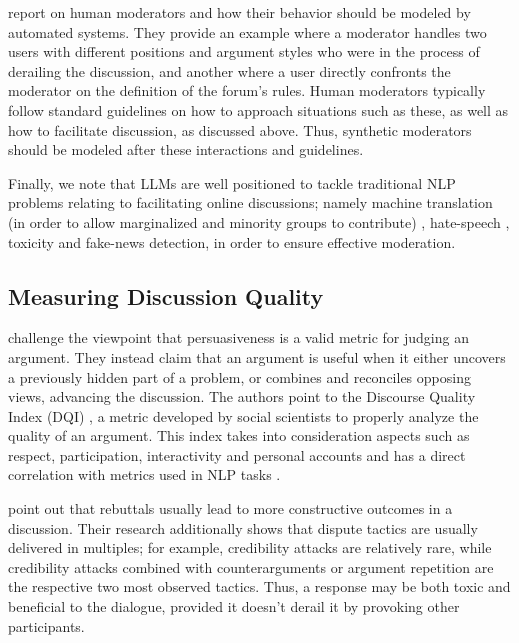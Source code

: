 \citet{vecchi-2021-towards} report on human moderators and how their behavior should be modeled by automated systems. They provide an example where a moderator handles two users with different positions and argument styles who were in the process of derailing the discussion, and another where a user directly confronts the moderator on the definition of the forum's rules. Human moderators typically follow standard guidelines on how to approach situations such as these, as well as how to facilitate discussion, as discussed above. Thus, synthetic moderators should be modeled after these interactions and guidelines.

Finally, we note that LLMs are well positioned to tackle traditional \ac{NLP} problems relating to facilitating online discussions; namely machine translation (in order to allow marginalized and minority groups to contribute) \cite{Tsai2024Generative}, hate-speech \cite{Nirmal2024TowardsIH, shi-2024-hatespeech}, toxicity \cite{kang-qian-2024-implanting, Wang2022ToxicityDW} and fake-news \cite{Liu2024DetectIJ, Xu2024ACS} detection, in order to ensure effective moderation. 


\subsection{Measuring Discussion Quality}
\label{sec:related:measures}

\citet{vecchi-2021-towards} challenge the viewpoint that persuasiveness is a valid metric for judging an argument. They instead claim that an argument is useful when it either uncovers a previously hidden part of a problem, or combines and reconciles opposing views, advancing the discussion. The authors point to the Discourse Quality Index (DQI) \cite{Steiner2005-STEDPI-8, stab-gurevych-2017-parsing}, a metric developed by social scientists to properly analyze the quality of an argument. This index takes into consideration aspects such as respect, participation, interactivity and personal accounts and has a direct correlation with metrics used in NLP tasks \cite{wachsmuth-etal-2017-computational}. 

\citet{dekock2022disagree} point out that rebuttals usually lead to more constructive outcomes in a discussion. Their research additionally shows that dispute tactics are usually delivered in multiples; for example, credibility attacks are relatively rare, while credibility attacks combined with counterarguments or argument repetition are the respective two most observed tactics. Thus, a response may be both toxic and beneficial to the dialogue, provided it doesn't derail it by provoking other participants.

